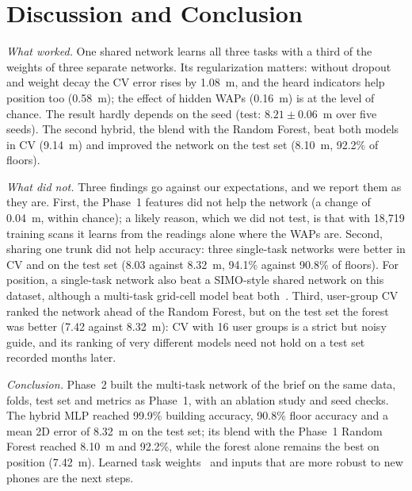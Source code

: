 \section{Discussion and Conclusion}\label{sec:conclusion}

\emph{What worked.} One shared network learns all three tasks with a third
of the weights of three separate networks. Its regularization matters:
without dropout and weight decay the CV error rises by 1.08~m, and the heard
indicators help position too (0.58~m); the effect of hidden WAPs (0.16~m) is at
the level of chance. The result hardly depends on the seed (test:
$8.21\pm0.06$~m over five seeds). The second hybrid, the blend with the
Random Forest, beat both models in CV (9.14~m) and improved the network on
the test set (8.10~m, 92.2\% of floors).

\emph{What did not.} Three findings go against our expectations, and we report
them as they are. First, the Phase~1 features did not help the network (a
change of 0.04~m, within chance); a likely reason, which we did not test, is
that with 18,719 training scans it learns from the readings alone where the
WAPs are. Second, sharing one trunk did not help accuracy: three single-task
networks were better in CV and on the test set (8.03 against 8.32~m, 94.1\%
against 90.8\% of floors). For position, a single-task network also beat a
SIMO-style shared network on this dataset, although a multi-task grid-cell
model beat both~\cite{laska2022multitask}. Third, user-group CV ranked the
network ahead of the Random Forest, but on the test set the forest was better
(7.42 against 8.32~m): CV with 16 user groups is a strict but noisy guide, and
its ranking of very different models need not hold on a test set recorded
months later.

\emph{Conclusion.} Phase~2 built the multi-task network of the brief on the
same data, folds, test set and metrics as Phase~1, with an ablation study and
seed checks. The hybrid MLP reached 99.9\% building accuracy, 90.8\% floor
accuracy and a mean 2D error of 8.32~m on the test set; its blend with the
Phase~1 Random Forest reached 8.10~m and 92.2\%, while the forest alone remains
the best on position (7.42~m). Learned
task weights~\cite{kendall2018multi} and inputs that are more robust to new
phones are the next steps.
